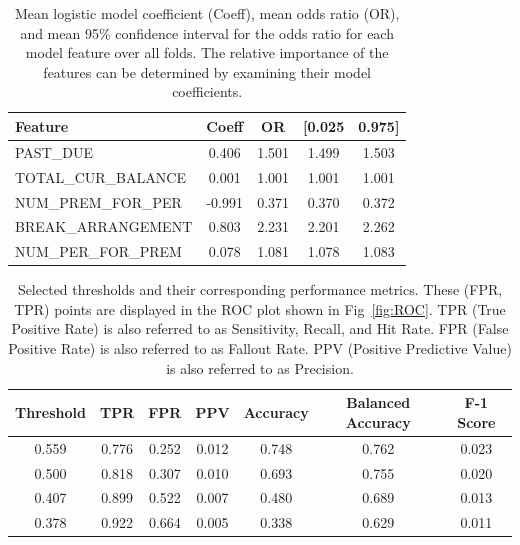 \documentclass[10pt,letterpaper]{article}
\begin{document}
\begin{table}[!h]
    \begin{tabular}{lcccc}
    \toprule
    Feature &                   Coeff &       OR &       [0.025 &       0.975] \\
    \midrule
    PAST\_DUE &                  0.406 &    1.501 &        1.499 &        1.503 \\
    TOTAL\_CUR\_BALANCE  &       0.001 &    1.001 &        1.001 &        1.001 \\
    NUM\_PREM\_FOR\_PER  &      -0.991 &    0.371 &        0.370 &        0.372 \\
    BREAK\_ARRANGEMENT   &       0.803 &    2.231 &        2.201 &        2.262 \\
    NUM\_PER\_FOR\_PREM  &       0.078 &    1.081 &        1.078 &        1.083 \\
    \bottomrule
    \end{tabular}
    \caption{Mean logistic model coefficient (Coeff), mean odds ratio (OR), and mean 95\% confidence interval for the odds ratio for each model feature over all folds. The relative importance of the features can be determined by examining their model coefficients.}
    \label{tbl:meanParams}
\end{table}

\begin{table}[htb]
    \centering
    \begin{tabular}{ccccccc}
        \toprule
        Threshold   &   TPR &   FPR & PPV   & Accuracy  &  Balanced Accuracy    & F-1 Score \\
        \midrule
        0.559       & 0.776 & 0.252 & 0.012 &     0.748 &     0.762             & 0.023 \\
        0.500       & 0.818 & 0.307 & 0.010 &     0.693 &     0.755             & 0.020 \\
        0.407       & 0.899 & 0.522 & 0.007 &     0.480 &     0.689             & 0.013 \\
        0.378       & 0.922 & 0.664 & 0.005 &     0.338 &     0.629             & 0.011 \\
        \bottomrule
    \end{tabular}
    \caption{Selected thresholds and their corresponding performance metrics. These (FPR, TPR) points are displayed in the ROC plot shown in Fig~\ref{fig:ROC}. TPR (True Positive Rate) is also referred to as Sensitivity, Recall, and Hit Rate. FPR (False Positive Rate) is also referred to as Fallout Rate. PPV (Positive Predictive Value) is also referred to as Precision.}
    \label{tbl:performance}
\end{table}
\end{document}

